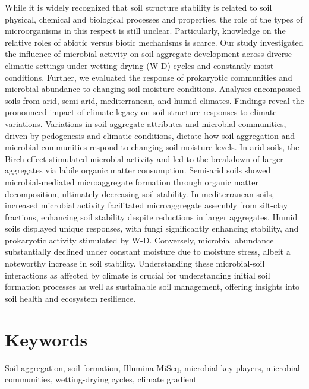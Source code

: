 While it is widely recognized that soil structure stability is related to soil physical, chemical and biological processes and properties, the role of the types of microorganisms in this respect is still unclear. Particularly, knowledge on the relative roles of abiotic versus biotic mechanisms is scarce. Our study investigated the influence of microbial activity on soil aggregate development across diverse climatic settings under wetting-drying (W-D) cycles and constantly moist conditions. Further, we evaluated the response of prokaryotic communities and microbial abundance to changing soil moisture conditions. Analyses encompassed soils from arid, semi-arid, mediterranean, and humid climates. Findings reveal the pronounced impact of climate legacy on soil structure responses to climate variations. Variations in soil aggregate attributes and microbial communities, driven by pedogenesis and climatic conditions, dictate how soil aggregation and microbial communities respond to changing soil moisture levels. In arid soils, the Birch-effect stimulated microbial activity and led to the breakdown of larger aggregates via labile organic matter consumption. Semi-arid soils showed microbial-mediated microaggregate formation through organic matter decomposition, ultimately decreasing soil stability. In mediterranean soils, increased microbial activity facilitated microaggregate assembly from silt-clay fractions, enhancing soil stability despite reductions in larger aggregates. Humid soils displayed unique responses, with fungi significantly enhancing stability, and prokaryotic activity stimulated by W-D. Conversely, microbial abundance substantially declined under constant moisture due to moisture stress, albeit a noteworthy increase in soil stability. Understanding these microbial-soil interactions as affected by climate is crucial for understanding initial soil formation processes as well as sustainable soil management, offering insights into soil health and ecosystem resilience.

\section*{Keywords} %
Soil aggregation, soil formation, Illumina MiSeq, microbial key players, microbial communities, wetting-drying cycles, climate gradient

